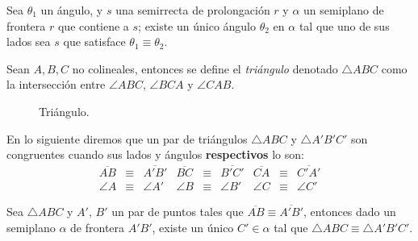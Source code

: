 \documentclass[11pt,a4paper]{book}
\begin{document}
\begin{axiom}[IV, 4]
Sea $\theta_1$ un ángulo, y $s$ una semirrecta de prolongación $r$ y $\alpha$ un semiplano de frontera $r$ que contiene a $s$; existe un único ángulo $\theta_2$ en $\alpha$ tal que uno de sus lados sea $s$ que satisface $\theta_1\equiv\theta_2$.
\end{axiom}
\begin{mydef}[Triángulo]
Sean $A,B,C$ no colineales, entonces se define el \textit{triángulo} denotado $\triangle ABC$
como la intersección entre $\angle ABC$, $\angle BCA$ y $\angle CAB$.
\end{mydef}
\begin{figure}[!ht]
\centering
{}
\caption{Triángulo.%
}
\end{figure}

En lo siguiente diremos que un par de triángulos $\triangle ABC$ y $\triangle A'B'C'$ son congruentes cuando sus lados y ángulos \textbf{respectivos} lo son:
$$\begin{array}{rclrclrcl}
\overline{AB}&\equiv&\overline{A'B'} &\overline{BC}&\equiv&\overline{B'C'} &\overline{CA}&\equiv&\overline{C'A'}\\
\angle A&\equiv&\angle A' &\angle B&\equiv&\angle B' &\angle C&\equiv&\angle C' 
\end{array}$$
\begin{axiom}[IV, 5]
Sea $\triangle ABC$ y $A',\,B'$ un par de puntos tales que $\overline{AB}\equiv\overline{A'B'}$, entonces dado un semiplano $\alpha$ de frontera $A'B'$, existe un único $C'\in\alpha$ tal que $\triangle ABC\equiv\triangle A'B'C'$.
\end{axiom}
\end{document}
